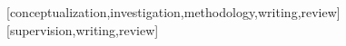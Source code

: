 \documentclass[portuguese]{textolivre}
\begin{document}





\printbibliography\label{sec-bib}
\begin{contributors}
[conceptualization,investigation,methodology,writing,review]
[supervision,writing,review]
\end{contributors}
\end{document}
